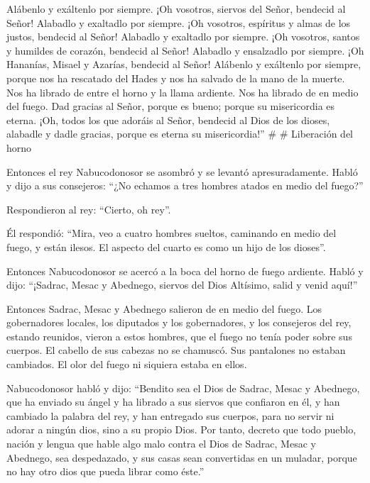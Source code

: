 Alábenlo y exáltenlo por siempre.  ¡Oh vosotros, siervos
del Señor, bendecid al Señor! Alabadlo y exaltadlo por siempre.
 ¡Oh vosotros, espíritus y almas de los justos, bendecid
al Señor! Alabadlo y exaltadlo por siempre.  ¡Oh
vosotros, santos y humildes de corazón, bendecid al Señor! Alabadlo y
ensalzadlo por siempre.  ¡Oh Hananías, Misael y Azarías,
bendecid al Señor! Alábenlo y exáltenlo por siempre, porque nos ha
rescatado del Hades y nos ha salvado de la mano de la muerte. Nos ha
librado de entre el horno y la llama ardiente. Nos ha librado de en
medio del fuego.  Dad gracias al Señor, porque es bueno;
porque su misericordia es eterna.  ¡Oh, todos los que
adoráis al Señor, bendecid al Dios de los dioses, alabadle y dadle
gracias, porque es eterna su misericordia!'' \# \# Liberación del horno

 Entonces el rey Nabucodonosor se asombró y se levantó
apresuradamente. Habló y dijo a sus consejeros: ``¿No echamos a tres
hombres atados en medio del fuego?''

Respondieron al rey: ``Cierto, oh rey''.

 Él respondió: ``Mira, veo a cuatro hombres sueltos,
caminando en medio del fuego, y están ilesos. El aspecto del cuarto es
como un hijo de los dioses''.

 Entonces Nabucodonosor se acercó a la boca del horno de
fuego ardiente. Habló y dijo: ``¡Sadrac, Mesac y Abednego, siervos del
Dios Altísimo, salid y venid aquí!''

Entonces Sadrac, Mesac y Abednego salieron de en medio del fuego.
 Los gobernadores locales, los diputados y los
gobernadores, y los consejeros del rey, estando reunidos, vieron a estos
hombres, que el fuego no tenía poder sobre sus cuerpos. El cabello de
sus cabezas no se chamuscó. Sus pantalones no estaban cambiados. El olor
del fuego ni siquiera estaba en ellos.

 Nabucodonosor habló y dijo: ``Bendito sea el Dios de
Sadrac, Mesac y Abednego, que ha enviado su ángel y ha librado a sus
siervos que confiaron en él, y han cambiado la palabra del rey, y han
entregado sus cuerpos, para no servir ni adorar a ningún dios, sino a su
propio Dios.  Por tanto, decreto que todo pueblo, nación
y lengua que hable algo malo contra el Dios de Sadrac, Mesac y Abednego,
sea despedazado, y sus casas sean convertidas en un muladar, porque no
hay otro dios que pueda librar como éste.''

